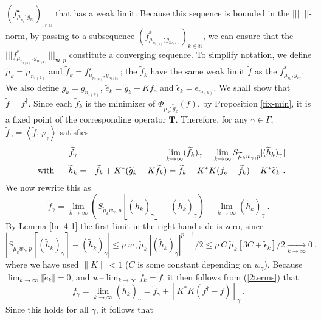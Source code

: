 \documentclass[10pt]{article}
\def\N{\mathbb{N}}
\def\T{\mathbf{T}}
\def\K{K^*}
\def\wf{\widetilde{f}}
\def\fs{f^{\dagger}}
\def\ag{w_{\gamma}}
\def\vpg{\varphi_{\gamma}}
\def\g{\gamma}
\newcommand\eref[1]{(\ref{#1})}
\def\Vvert{\vert\!\vert\!\vert}
\begin{document}
$(f^\star_{\mu_{n_l};g_{n_l}})_{_{l \in {\N}}}$ that has a weak limit.
Because this sequence is bounded in the $\Vvert \; \Vvert $-norm,
by passing to a subsequence
 $\left( f^*_{\mu_{n_{l(k)}};g_{n_{l(k)}}}\right)_{k \in \N}$, we can
ensure that the $\Vvert f^*_{\mu_{n_{l(k)}};g_{n_{l(k)}}}
\Vvert_{\mathbf{w},p}$
constitute a converging sequence.
To simplify notation, we define $\widetilde\mu_k = \mu_{n_{l(k)}}$ and
${\widetilde f}_k =
f^\star_{\mu_{n_{l(k)}};g_{n_{l(k)}}}$; the $\widetilde{f}_k$ have the
same weak limit $\widetilde{f}$ as the $f^*_{\mu_{n_l};g_{n_l}}$.
We also define
$\widetilde{g}_k = g_{n_{l(k)}}$,
${\widetilde e}_k = \widetilde{g}_k-Kf_o$ and $\widetilde\epsilon_k =
\epsilon_{n_{l(k)}}$.
We shall show that $\widetilde{f}=\fs$.
\newline
Since each $\widetilde{f}_k $ is the minimizer of
$\Phi_{\widetilde\mu_k; \widetilde{g}_k}(f) $, by Proposition \ref{fix-min}, it
is a fixed point of the corresponding operator $\T$. Therefore, for any $\g \in
\Gamma$,
${\wf}_\g  =
\left<{\wf},\vpg \right>$ satisfies
\begin{eqnarray*}
{\wf}_\g & = &\lim_{k\to\infty}({\wf}_k)_\g  =
\lim_{k\to\infty} S_{\widetilde\mu_k \ag,p}[({\widetilde h}_k)_\g] \\
\hbox{\ \ with\ \ } ~~~  {\widetilde h}_k & = &
{\wf}_k + K^*(\widetilde g_k-K{\wf}_k)=
\wf_k + \K K (f_o - \wf_k)+ K^*{\widetilde e}_k ~.
\end{eqnarray*}
We now rewrite this as
\begin{equation}
\label{2terms}
{\wf}_\g=\lim_{k\to\infty}
\left(S_{\widetilde\mu_k \ag,p}[({\widetilde h}_k)_\g] -
({\widetilde h}_k)_\g \right) +
\lim_{k\to\infty} ({\widetilde h}_k)_\g ~ .
\end{equation}
By Lemma \ref{lm-4-1} the first limit in the right hand side is zero, since
$$
\left|S_{\widetilde\mu_k \ag,p}[({\widetilde h}_k)_\g] -
({\widetilde h}_k)_\g \right|
\leq  p\ \ag\,   \widetilde{\mu}_k
~| (\widetilde h_k)_\g |^{p-1} /2\leq p\ C\  \widetilde{\mu}_k
[ 3C + \widetilde\epsilon_k ] /2 \xrightarrow[k \to \infty]{~} 0~,
$$
where we have used $\|K\|<1$ ($C$ is some constant depending on $\ag$). Because
$\lim_{k
\to
\infty}\Vert\widetilde{e}_k\Vert=0$, and {\em w}$\,$--$\lim_{k \to \infty}
\wf_k =
\wf$,  it then follows from \eref{2terms} that
\begin{equation*}
{\wf}_\g = \lim_{k\to\infty} ({\widetilde h}_k)_\g = {\wf}_\g +
[\K K(\fs -{\wf})]_\g \ .
\end{equation*}
Since this holds for all $\g$, it follows that
\end{document}
